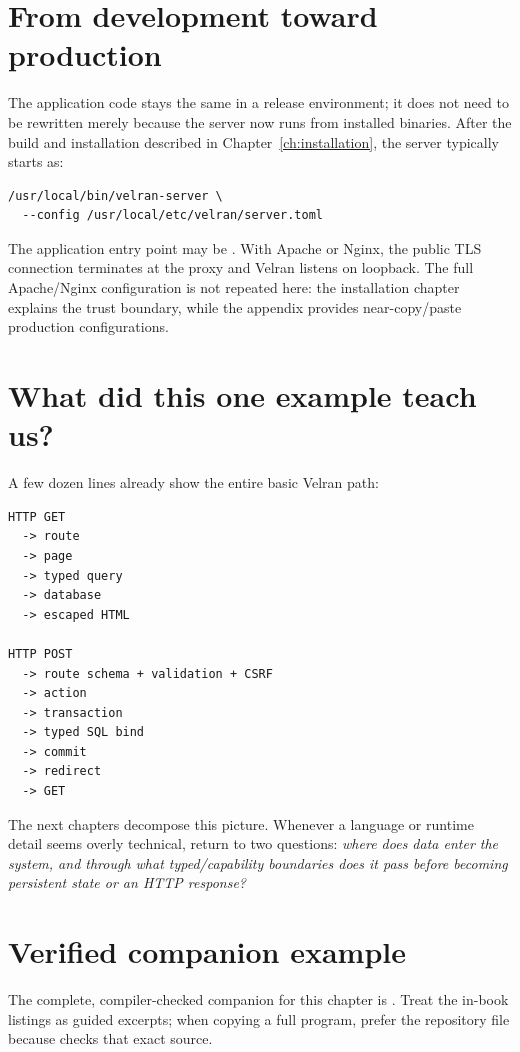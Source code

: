 \section{From development toward production}

The application code stays the same in a release environment; it does not need to be rewritten merely because the server now runs from installed binaries. After the build and installation described in Chapter~\ref{ch:installation}, the server typically starts as:

\begin{lstlisting}
/usr/local/bin/velran-server \
  --config /usr/local/etc/velran/server.toml
\end{lstlisting}

The application entry point may be . With Apache or Nginx, the public TLS connection terminates at the proxy and Velran listens on loopback. The full Apache/Nginx configuration is not repeated here: the installation chapter explains the trust boundary, while the appendix provides near-copy/paste production configurations.

\section{What did this one example teach us?}

A few dozen lines already show the entire basic Velran path:

\begin{lstlisting}
HTTP GET
  -> route
  -> page
  -> typed query
  -> database
  -> escaped HTML

HTTP POST
  -> route schema + validation + CSRF
  -> action
  -> transaction
  -> typed SQL bind
  -> commit
  -> redirect
  -> GET
\end{lstlisting}

The next chapters decompose this picture. Whenever a language or runtime detail seems overly technical, return to two questions: \emph{where does data enter the system, and through what typed/capability boundaries does it pass before becoming persistent state or an HTTP response?}

\section{Verified companion example}
The complete, compiler-checked companion for this chapter is . Treat the in-book listings as guided excerpts; when copying a full program, prefer the repository file because  checks that exact source.


